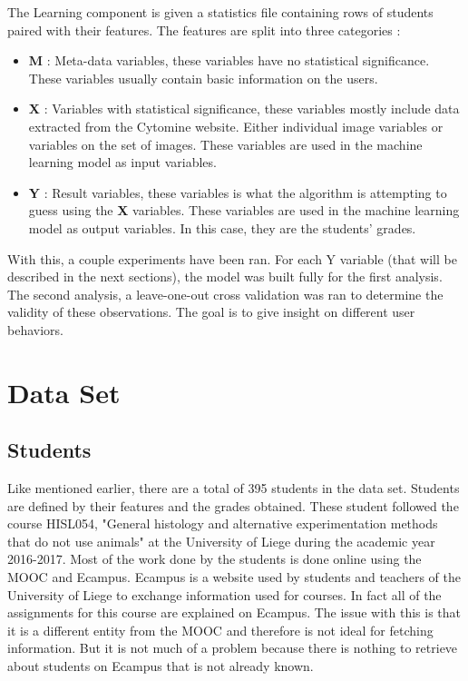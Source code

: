 \documentclass[a4paper,11pt]{report}
\numberwithin{figure}{chapter} %
\begin{document}
    The Learning component is given a statistics file containing rows of students paired with their features.
    The features are split into three categories :
    \begin{itemize}
\item[\textbullet] \textbf{M} : Meta-data variables, these variables have no statistical significance.
These variables usually contain basic information on the users.\\
\item[\textbullet] \textbf{X} : Variables with statistical significance, these variables mostly include data extracted from the Cytomine website.
Either individual image variables or variables on the set of images.
These variables are used in the machine learning model as input variables.\\
\item[\textbullet] \textbf{Y} : Result variables, these variables is what the algorithm is attempting to guess using the  \textbf{X} variables.
These variables are used in the machine learning model as output variables. In this case, they are the students' grades.\\
\end{itemize}

    With this, a couple experiments have been ran.
    For each Y variable (that will be described in the next sections), the model was built fully for the first analysis.
    The second analysis, a leave-one-out cross validation was ran to determine the validity of these observations.
    The goal is to give insight on different user behaviors.

    \section{Data Set} \label{Data_Set}

    	\subsection{Students}
    Like mentioned earlier, there are a total of 395 students in the data set.
    Students are defined by their features and the grades obtained.
    These student followed the course HISL054, "General histology and alternative experimentation methods that do not use animals" at the University of Liege during the academic year 2016-2017.
    Most of the work done by the students is done online using the MOOC and Ecampus.
    Ecampus is a website used by students and teachers of the University of Liege to exchange information used for courses.
    In fact all of the assignments for this course are explained on Ecampus.
    The issue with this is that it is a different entity from the MOOC and therefore is not ideal for fetching information.
    But it is not much of a problem because there is nothing to retrieve about students on Ecampus that is not already known.\newline
\end{document}
